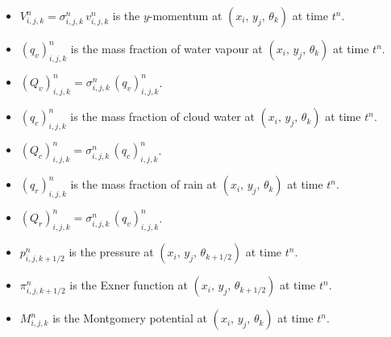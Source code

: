 \documentclass{article}
\numberwithin{equation}{section}
\begin{document}
\begin{itemize}
			\item $V_{i,j,k}^n = \sigma_{i,j,k}^n \, v_{i,j,k}^n$ is the $y$-momentum at $(x_i, \, y_j, \, \theta_k)$ at time $t^n$.
			\item $(q_v)_{i,j,k}^n$ is the mass fraction of water vapour at $(x_i, \, y_j, \, \theta_k)$ at time $t^n$.
			\item $(Q_v)_{i,j,k}^n = \sigma_{i,j,k}^n \, (q_v)_{i,j,k}^n$.
			\item $(q_c)_{i,j,k}^n$ is the mass fraction of cloud water at $(x_i, \, y_j, \, \theta_k)$ at time $t^n$.
			\item $(Q_c)_{i,j,k}^n = \sigma_{i,j,k}^n \, (q_c)_{i,j,k}^n$.
			\item $(q_r)_{i,j,k}^n$ is the mass fraction of rain at $(x_i, \, y_j, \, \theta_k)$ at time $t^n$.
			\item $(Q_r)_{i,j,k}^n = \sigma_{i,j,k}^n \, (q_v)_{i,j,k}^n$.
			\item $p_{i,j,k+1/2}^n$ is the pressure at $(x_i, \, y_j, \, \theta_{k+1/2})$ at time $t^n$.
			\item $\pi_{i,j,k+1/2}^n$ is the Exner function at $(x_i, \, y_j, \, \theta_{k+1/2})$ at time $t^n$.
			\item $M_{i,j,k}^n$ is the Montgomery potential at $(x_i, \, y_j, \, \theta_k)$ at time $t^n$.
		\end{itemize}
\end{document}

